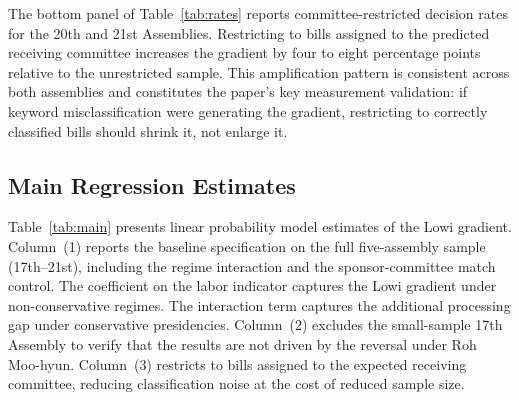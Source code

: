 \documentclass[11pt]{article}
\begin{document}
The bottom panel of Table~\ref{tab:rates} reports committee-restricted decision rates for the 20th and 21st Assemblies. Restricting to bills assigned to the predicted receiving committee increases the gradient by four to eight percentage points relative to the unrestricted sample. This amplification pattern is consistent across both assemblies and constitutes the paper's key measurement validation: if keyword misclassification were generating the gradient, restricting to correctly classified bills should shrink it, not enlarge it.

\subsection{Main Regression Estimates}
\label{sec:results-reg}

Table~\ref{tab:main} presents linear probability model estimates of the Lowi gradient. Column~(1) reports the baseline specification on the full five-assembly sample (17th--21st), including the regime interaction and the sponsor-committee match control. The coefficient on the labor indicator captures the Lowi gradient under non-conservative regimes. The interaction term captures the additional processing gap under conservative presidencies. Column~(2) excludes the small-sample 17th Assembly to verify that the results are not driven by the reversal under Roh Moo-hyun. Column~(3) restricts to bills assigned to the expected receiving committee, reducing classification noise at the cost of reduced sample size.
\end{document}
